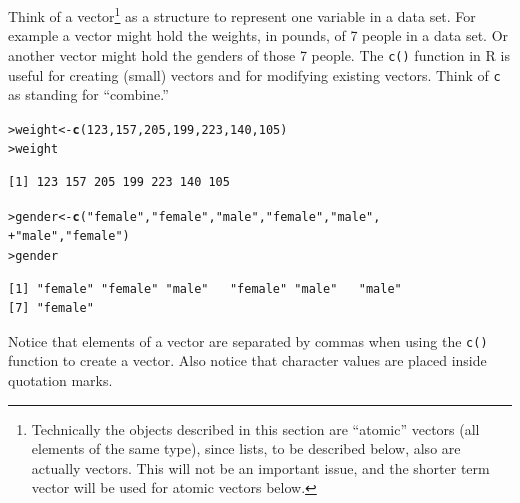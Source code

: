 \documentclass[12pt,oneside]{book}\usepackage[]{graphicx}\usepackage[]{color}
\makeatletter
\newcommand{\hlnum}[1]{\textcolor[rgb]{0.686,0.059,0.569}{#1}}%
\newcommand{\hlstr}[1]{\textcolor[rgb]{0.192,0.494,0.8}{#1}}%
\newcommand{\hlstd}[1]{\textcolor[rgb]{0.345,0.345,0.345}{#1}}%
\newcommand{\hlkwb}[1]{\textcolor[rgb]{0.69,0.353,0.396}{#1}}%
\newcommand{\hlkwd}[1]{\textcolor[rgb]{0.737,0.353,0.396}{\textbf{#1}}}%
\newenvironment{kframe}{%
 \def\at@end@of@kframe{}%
 \ifinner\ifhmode%
  \def\at@end@of@kframe{\end{minipage}}%
  \begin{minipage}{\columnwidth}%
 \fi\fi%
 \def\FrameCommand##1{\hskip\@totalleftmargin \hskip-\fboxsep
 \colorbox{shadecolor}{##1}\hskip-\fboxsep
     \hskip-\linewidth \hskip-\@totalleftmargin \hskip\columnwidth}%
 \MakeFramed {\advance\hsize-\width
   \@totalleftmargin\z@ \linewidth\hsize
   \@setminipage}}%
 {\par\unskip\endMakeFramed%
 \at@end@of@kframe}
\newenvironment{knitrout}{}{} %
\makeatother
\begin{document}
Think of a vector\footnote{Technically the objects described in this section are ``atomic'' vectors (all elements of the same type), since lists, to be described below, also are actually vectors. This will not be an important issue, and the shorter term vector will be used for atomic vectors below.} as a structure to represent one variable in a data set. For example a vector might hold the weights, in pounds, of 7 people in a data set. Or another vector might hold the genders of those 7 people. The \verb+c()+ function in R is useful for creating (small) vectors and for modifying existing vectors. Think of \verb+c+ as standing for ``combine.''
\begin{knitrout}
\color{fgcolor}\begin{kframe}
\begin{alltt}
\hlstd{> }\hlstd{weight} \hlkwb{<-} \hlkwd{c}\hlstd{(}\hlnum{123}\hlstd{,} \hlnum{157}\hlstd{,} \hlnum{205}\hlstd{,} \hlnum{199}\hlstd{,} \hlnum{223}\hlstd{,} \hlnum{140}\hlstd{,} \hlnum{105}\hlstd{)}
\hlstd{> }\hlstd{weight}
\end{alltt}
\begin{verbatim}
[1] 123 157 205 199 223 140 105
\end{verbatim}
\begin{alltt}
\hlstd{> }\hlstd{gender} \hlkwb{<-} \hlkwd{c}\hlstd{(}\hlstr{"female"}\hlstd{,} \hlstr{"female"}\hlstd{,} \hlstr{"male"}\hlstd{,} \hlstr{"female"}\hlstd{,} \hlstr{"male"}\hlstd{,}
\hlstd{+ }            \hlstr{"male"}\hlstd{,} \hlstr{"female"}\hlstd{)}
\hlstd{> }\hlstd{gender}
\end{alltt}
\begin{verbatim}
[1] "female" "female" "male"   "female" "male"   "male"  
[7] "female"
\end{verbatim}
\end{kframe}
\end{knitrout}
Notice that elements of a vector are separated by commas when using the \verb+c()+ function to create a vector. Also notice that character values are placed inside quotation marks. 
\end{document}
